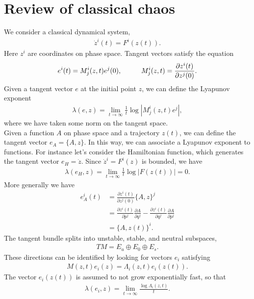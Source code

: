 \documentclass[JHEP,12pt]{article}
\begin{document}
\section{Review of classical chaos}
We consider a classical dynamical system, 
\begin{align}
\dot{z}^i(t)=F^i(z(t)).
\end{align}
Here $z^i$ are coordinates on phase space. Tangent vectors satisfy the equation
\begin{align}
e^i(t)=M^i_j(z,t)e^j(0),\hspace{10  mm}M^i_j(z,t)=\frac{\partial z^i(t)}{\partial z^j(0)}.
\end{align}
Given a tangent vector $e$ at the initial point $z$, we can define the Lyapunov exponent 
\begin{align}
\lambda(e,z)=\lim_{t\to \infty}\frac{1}{t}\log |M^i_j(z,t)e^j|,
\end{align}
where we have taken some norm on the tangent space.\\
\indent Given a function $A$ on phase space and a trajectory $z(t)$, we can define the tangent vector $e_A=\{A,z\}$. In this way, we can associate a Lyapunov exponent to functions. For instance let's consider the Hamiltonian function, which generates the tangent vector $e_H=\dot{z}$. Since $\dot{z}^i=F^i(z)$ is bounded, we have 
\begin{align}
\lambda(e_H,z)=\lim_{t\to \infty}\frac{1}{t}\log |F(z(t))|=0.
\end{align}
More generally we have 
\begin{align}
e^i_A(t)&=\frac{\partial z^i(t)}{\partial z^j(0)}\{A,z\}^j\\
&=\frac{\partial z^i(t)}{\partial p^j}\frac{\partial A}{\partial q^j}-\frac{\partial z^i(t)}{\partial q^j}\frac{\partial A}{\partial p^j}\\
&=\{A,z(t)\}^i.
\end{align}
\indent The tangent bundle splits into unstable, stable, and neutral subspaces, 
\begin{align}
TM= E_u\oplus E_0\oplus E_s.
\end{align}
These directions can be identified by looking for vectors $e_i$ satisfying 
\begin{align}
M(z,t)e_i(z)=\Lambda_i(z,t)e_i(z(t)).
\end{align}
The vector $e_i(z(t))$ is assumed to not grow exponentially fast, so that 
\begin{align}
\lambda(e_i,z)=\lim_{t\to \infty}\frac{\log \Lambda_i(z,t)}{t}.
\end{align}
\end{document}

